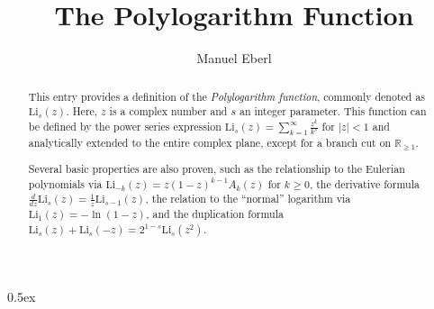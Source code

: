 \documentclass[11pt,a4paper]{article}
\begin{document}
\title{The Polylogarithm Function}
\author{Manuel Eberl}
\maketitle

\begin{abstract}
This entry provides a definition of the \emph{Polylogarithm function}, commonly denoted as
$\text{Li}_s(z)$. Here, $z$ is a complex number and $s$ an integer parameter. This function
can be defined by the power series expression $\text{Li}_s(z) = \sum_{k=1}^\infty \frac{z^k}{k^s}$
for $|z| < 1$ and analytically extended to the entire complex plane, except for a branch cut on
$\mathbb{R}_{\geq 1}$.

Several basic properties are also proven, such as the relationship to the Eulerian polynomials via
$\text{Li}_{-k}(z) = z (1 - z)^{k-1} A_k(z)$ for $k\geq 0$,
the derivative formula $\frac{d}{dz} \text{Li}_s(z) = \frac{1}{z} \text{Li}_{s-1}(z)$,
the relation to the ``normal'' logarithm via $\text{Li}_1(z) = -\ln (1 - z)$,
and the duplication formula $\text{Li}_s(z) + \text{Li}_s(-z) = 2^{1-s} \text{Li}_s(z^2)$.
\end{abstract}


\tableofcontents

\newpage
\parindent 0pt\parskip 0.5ex
\end{document}
